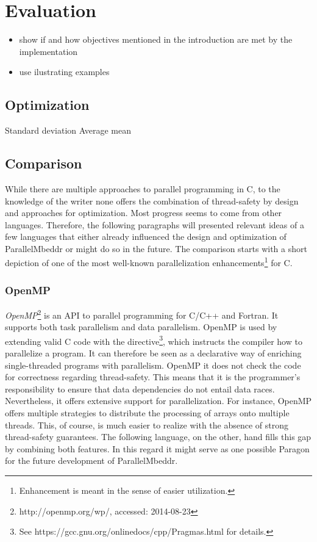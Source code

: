 \chapter{Evaluation}

\begin{itemize}
\item show if and how objectives mentioned in the introduction are met by the implementation
\item use ilustrating examples
\end{itemize}

\section{Optimization}
Standard deviation
Average mean

\section{Comparison}
While there are multiple approaches to parallel programming in C, to the knowledge of the writer none offers the combination of thread-safety by design and approaches for optimization. Most progress seems to come from other languages. Therefore, the following paragraphs will presented relevant ideas of a few languages that either already influenced the design and optimization of ParallelMbeddr or might do so in the future. The comparison starts with a short depiction of one of the most well-known parallelization enhancements\footnote{Enhancement is meant in the sense of easier utilization.} for C.

\subsection{OpenMP}
\textit{OpenMP}\footnote{http://openmp.org/wp/, accessed: 2014-08-23} is an API to parallel programming for C/C++ and Fortran\cite[p.~1]{OpenMP}. It supports both task parallelism and data parallelism. OpenMP is used by extending valid C code with the  directive\footnote{See https://gcc.gnu.org/onlinedocs/cpp/Pragmas.html for details.}, which instructs the compiler how to parallelize a program. It can therefore be seen as a declarative way of enriching single-threaded programs with parallelism. OpenMP it does not check the code for correctness regarding thread-safety. This means that it is the programmer's responsibility to ensure that data dependencies do not entail data races. Nevertheless, it offers extensive support for parallelization. For instance, OpenMP offers multiple strategies to distribute the processing of arrays onto multiple threads. This, of course, is much easier to realize with the absence of strong thread-safety guarantees. The following language, on the other, hand fills this gap by combining both features. In this regard it might serve as one possible Paragon for the future development of ParallelMbeddr.

